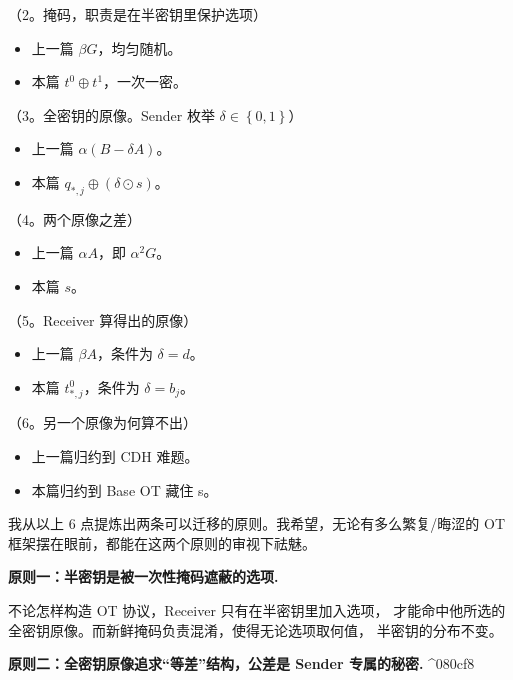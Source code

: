 （2。掩码，职责是在半密钥里保护选项）

\begin{itemize}

\item
  上一篇 $\beta G$，均匀随机。
\item
  本篇 $t^0\oplus t^1$，一次一密。
\end{itemize}

（3。全密钥的原像。Sender 枚举 $\delta\in\left\{0,1\right\}$）

\begin{itemize}

\item
  上一篇 $\alpha (B-\delta A)$。
\item
  本篇 $q_{*,j}\oplus(\delta\odot s)$。
\end{itemize}

（4。两个原像之差）

\begin{itemize}

\item
  上一篇 $\alpha A$，即 $\alpha^2 G$。
\item
  本篇 $s$。
\end{itemize}

（5。Receiver 算得出的原像）

\begin{itemize}

\item
  上一篇 $\beta A$，条件为 $\delta=d$。
\item
  本篇 $t_{*,j}^0$，条件为 $\delta=b_j$。
\end{itemize}

（6。另一个原像为何算不出）

\begin{itemize}

\item
  上一篇归约到 CDH 难题。
\item
  本篇归约到 Base OT 藏住 s。
\end{itemize}

我从以上 6 点提炼出两条可以迁移的原则。我希望，无论有多么繁复/晦涩的 OT
框架摆在眼前，都能在这两个原则的审视下祛魅。

\textbf{原则一：半密钥是被一次性掩码遮蔽的选项.}

不论怎样构造 OT 协议，Receiver 只有在半密钥里加入选项，
才能命中他所选的全密钥原像。而新鲜掩码负责混淆，使得无论选项取何值，
半密钥的分布不变。

\textbf{原则二：全密钥原像追求“等差”结构，公差是 Sender 专属的秘密.}
\^{}080cf8

